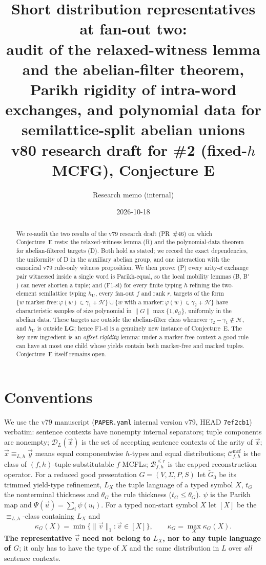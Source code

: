\documentclass[11pt]{article}
\title{Short distribution representatives at fan-out two:\\
audit of the relaxed-witness lemma and the abelian-filter theorem,\\
Parikh rigidity of intra-word exchanges, and polynomial data for\\
semilattice-split abelian unions\\[4pt]
\large v80 research draft for \#2 (fixed-$h$ MCFG), Conjecture E}
\author{Research memo (internal)}
\date{2026-10-18}
\theoremstyle{definition}
\theoremstyle{remark}
\newcommand{\Cmcf}[2]{\mathcal{C}^{\mathrm{mcf}}_{#1,#2}}
\newcommand{\D}{\mathcal{D}}
\newcommand{\tuple}[1]{\vec{#1}}
\newcommand{\B}{\mathcal B}
\begin{document}
\maketitle

\begin{abstract}
We re-audit the two results of the v79 research draft (PR~\#46) on which
Conjecture~E rests: the relaxed-witness lemma (R) and the polynomial-data
theorem for abelian-filtered targets (D).  Both hold as stated; we record
the exact dependencies, the uniformity of D in the auxiliary abelian group,
and one interaction with the canonical v79 rule-only witness proposition.
We then prove: (P) every arity-$d$ exchange pair witnessed inside a single
word is Parikh-equal, so the local mobility lemmas (B, B$'$) can never
shorten a tuple; and (F1-sl) for every finite typing $h$ refining the
two-element semilattice typing $h_{\mathrm U}$, every fan-out $f$ and rank
$r$, targets of the form
$\{w\text{ marker-free}:\varphi(w)\in\gamma_1+\mathcal H\}\cup
 \{w\text{ with a marker}:\varphi(w)\in\gamma_2+\mathcal H\}$
have characteristic samples of size polynomial in
$\|G\|\max\{1,\theta_G\}$, uniformly in the abelian data.  These targets are
outside the abelian-filter class whenever $\gamma_2-\gamma_1\notin\mathcal H$,
and $h_{\mathrm U}$ is outside $\mathbf{LG}$; hence F1-sl is a genuinely
new instance of Conjecture~E.  The key new ingredient is an
\emph{offset-rigidity} lemma: under a marker-free context a good rule can
have at most one child whose yields contain both marker-free and marked
tuples.  Conjecture~E itself remains open.
\end{abstract}

\section{Conventions}
We use the v79 manuscript (\texttt{PAPER.yaml} internal version v79, HEAD
\texttt{7ef2cb1}) verbatim: sentence contexts have nonempty internal
separators; tuple components are nonempty; $\D_L(\tuple x)$ is the set of
accepting sentence contexts of the arity of $\tuple x$;
$\tuple x\equiv_{L,h}\tuple y$ means equal componentwise $h$-types and equal
distributions; $\Cmcf{f}{h}$ is the class of $(f,h)$-tuple-substitutable
$f$-MCFLs; $\B^{\le r}_{f,h}$ is the capped reconstruction operator.  For a
reduced good presentation $G=(V,\Sigma,P,S)$ let $\widetilde G_0$ be its
trimmed yield-type refinement, $L_X$ the tuple language of a typed symbol
$X$, $t_G$ the nonterminal thickness and $\theta_G$ the rule thickness
($t_G\le\theta_G$).  $\psi$ is the Parikh map and
$\Psi(\tuple u)=\sum_i\psi(u_i)$.  For a typed non-start symbol $X$ let
$[X]$ be the $\equiv_{L,h}$-class containing $L_X$ and
\[
\kappa_G(X)=\min\{\|\tuple v\|_1:\tuple v\in[X]\},\qquad
\kappa_G=\max_X\kappa_G(X).
\]
\textbf{The representative $\tuple v$ need not belong to $L_X$, nor to any
tuple language of $G$}; it only has to have the type of $X$ and the same
distribution in $L$ over \emph{all} sentence contexts.
\end{document}
